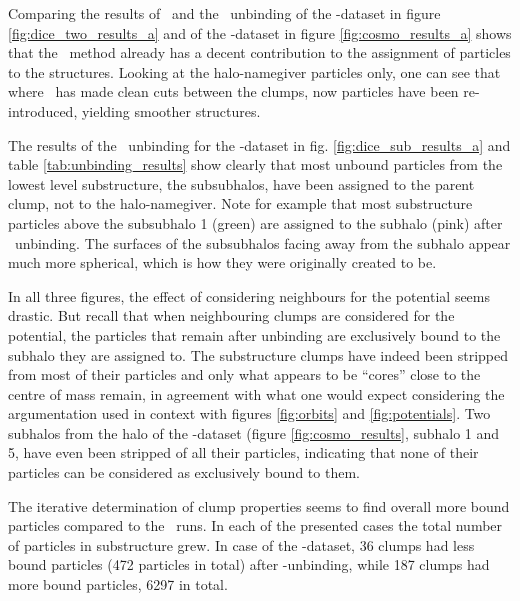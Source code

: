 


Comparing the results of \phew\ and the \simple\ unbinding of the \dt-dataset in figure \ref{fig:dice_two_results_a} and of the \cosmo-dataset in figure \ref{fig:cosmo_results_a} shows that the \simple\ method already has a decent contribution to the assignment of particles to the structures.
Looking at the halo-namegiver particles only, one can see that where \phew\ has made clean cuts between the clumps, now particles have been re-introduced, yielding smoother structures.

The results of the \simple\ unbinding for the \ds-dataset in fig. \ref{fig:dice_sub_results_a} and table \ref{tab:unbinding_results} show clearly that most unbound particles from the lowest level substructure, the subsubhalos, have been assigned to the parent clump, not to the halo-namegiver.
Note for example that most substructure particles above the subsubhalo 1 (green) are assigned to the subhalo (pink) after \simple\ unbinding.
The surfaces of the subsubhalos facing away from the subhalo appear much more spherical, which is how they were originally created to be.


In all three figures, the effect of considering neighbours for the potential seems drastic.
But recall that when neighbouring clumps are considered for the potential, the particles that remain after unbinding are exclusively bound to the subhalo they are assigned to.
The substructure clumps have indeed been stripped from most of their particles and only what appears to be ``cores'' close to the centre of mass remain, in agreement with what one would expect considering the argumentation used in context with figures \ref{fig:orbits} and \ref{fig:potentials}. 
Two subhalos from the halo of the \cosmo-dataset (figure \ref{fig:cosmo_results}, subhalo 1 and 5, have even been stripped of all their particles, indicating that none of their particles can be considered as exclusively bound to them.



The iterative determination of clump properties seems to find overall more bound particles compared to the \neigh\ runs.
In each of the presented cases the total number of particles in substructure grew.
In case of the \cosmo-dataset, 36 clumps had less bound particles (472 particles in total) after \iter-unbinding, while 187 clumps had more bound particles, 6297 in total.


